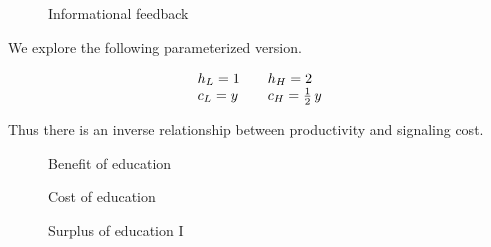 \begin{frame}\begin{figure}[htp]\centering
\caption{Informational feedback}
\end{figure}\end{frame}
\begin{frame}

We explore the following parameterized version.

\begin{align*}\begin{array}{l@{\qquad}l}
	h_L = 1   & h_H = 2 \\
	c_L = y   & c_H = \tfrac{1}{2}\,y \\
\end{array}\end{align*}\vspace{0.5cm}

Thus there is an inverse relationship between productivity and signaling cost.
\end{frame}
\begin{frame}\begin{figure}[htp]\centering
\caption{Benefit of education}
\end{figure}\end{frame}
\begin{frame}\begin{figure}[htp]\centering
\caption{Cost of education}
\end{figure}\end{frame}
\begin{frame}\begin{figure}[htp]\centering
\caption{Surplus of education I}
\end{figure}\end{frame}
